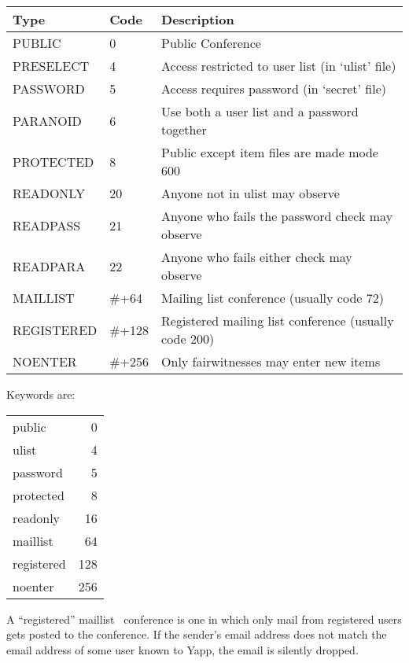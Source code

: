 \documentclass[twoside]{report}
\begin{document}
\begin{description}
\begin{tabular}{llp{7cm}}
   Type      & Code  & Description\\ \hline
   PUBLIC    & 0     & Public Conference \\
   PRESELECT &   4   & Access restricted to user list (in `ulist' file)\\
   PASSWORD  &   5   & Access requires password (in `secret' file)\\
   PARANOID  &   6   & Use both a user list and a password together\\
   PROTECTED &   8   & Public except item files are made mode 600\\
   READONLY  &  20   & Anyone not in ulist may observe\\
   READPASS  &  21   & Anyone who fails the password check may observe\\
   READPARA  &  22   & Anyone who fails either check may observe\\
   MAILLIST  &  \#+64 & Mailing list conference (usually code 72)\\
   REGISTERED&  \#+128& Registered mailing list conference (usually code 200)\\
   NOENTER   &  \#+256& Only fairwitnesses may enter new items\\ \hline
\end{tabular}
\vspace{12pt}

         Keywords are:

         \begin{tabular}{lr}
            public     &  0\\
            ulist      &  4\\
            password   &  5\\
            protected  &  8\\
            readonly   & 16\\
            maillist   & 64\\
            registered &128\\
            noenter    &256\\
         \end{tabular}

         A ``registered'' maillist~ conference is one in 
         which only mail from registered users gets posted to the conference.  
         If the sender's email address does not match the email address 
         of some user known to Yapp, the email is silently dropped.


\end{description}
\end{document}
